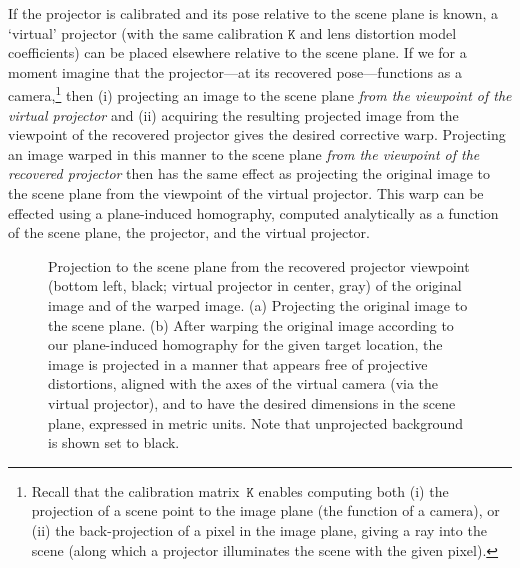 \documentclass[review]{elsarticle}
\begin{document}
If the projector is calibrated and its pose relative to the scene plane is known, a `virtual' projector (with the same calibration $\mathtt{K}$ and lens distortion model coefficients) can be placed elsewhere relative to the scene plane. If we for a moment imagine that the projector---at its recovered pose---functions as a camera,\footnote{Recall that the calibration matrix~$\mathtt{K}$ enables computing both (i) the projection of a scene point to the image plane (the function of a camera), or (ii) the back-projection of a pixel in the image plane, giving a ray into the scene (along which a projector illuminates the scene with the given pixel).} then (i) projecting an image to the scene plane \textit{from the viewpoint of the virtual projector} and (ii) acquiring the resulting projected image from the viewpoint of the recovered projector gives the desired corrective warp. Projecting an image warped in this manner to the scene plane \textit{from the viewpoint of the recovered projector} then has the same effect as projecting the original image to the scene plane from the viewpoint of the virtual projector. This warp can be effected using a plane-induced homography, computed analytically as a function of the scene plane, the projector, and the virtual projector.

\begin{figure}
    \centering
    \qquad
    \caption{Projection to the scene plane from the recovered projector viewpoint (bottom left, black; virtual projector in center, gray) of the original image and of the warped image. (a) Projecting the original image to the scene plane. (b) After warping the original image according to our plane-induced homography for the given target location, the image is projected in a manner that appears free of projective distortions, aligned with the axes of the virtual camera (via the virtual projector), and to have the desired dimensions in the scene plane, expressed in metric units. Note that unprojected background is shown set to black.}
    \label{fig:warp}
\end{figure}
\end{document}
